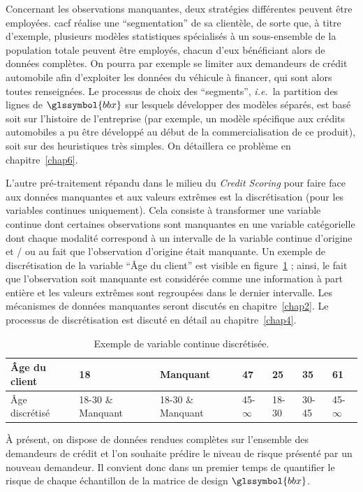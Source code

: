 Concernant les observations manquantes, deux stratégies différentes peuvent être employées. \gls{cacf} réalise une ``segmentation'' de sa clientèle, de sorte que, à titre d'exemple, plusieurs modèles statistiques spécialisés à un sous-ensemble de la population totale peuvent être employés, chacun d'eux bénéficiant alors de données complètes. On pourra par exemple se limiter aux demandeurs de crédit automobile afin d'exploiter les données du véhicule à financer, qui sont alors toutes renseignées. Le processus de choix des ``segments'', \textit{i.e.}\ la partition des lignes de $\glssymbol{bbx}$ sur lesquels développer des modèles séparés, est basé soit sur l'histoire de l'entreprise (par exemple, un modèle spécifique aux crédits automobiles a pu être développé au début de la commercialisation de ce produit), soit sur des heuristiques très simples. On détaillera ce problème en chapitre~\ref{chap6}.

L'autre pré-traitement répandu dans le milieu du \textit{Credit Scoring} pour faire face aux données manquantes et aux valeurs extrêmes est la discrétisation (pour les variables continues uniquement). Cela consiste à transformer une variable continue dont certaines observations sont manquantes en une variable catégorielle dont chaque modalité correspond à un intervalle de la variable continue d'origine et / ou au fait que l'observation d'origine était manquante. Un exemple de discrétisation de la variable ``Âge du client'' est visible en figure~\ref{tab:disc_ex} ; ainsi, le fait que l'observation soit manquante est considérée comme une information à part entière et les valeurs extrêmes sont regroupées dans le dernier intervalle. Les mécanismes de données manquantes seront discutés en chapitre~\ref{chap2}. Le processus de discrétisation est discuté en détail au chapitre~\ref{chap4}.

\begin{table}
\centering
\caption{\label{tab:disc_ex} Exemple de variable continue discrétisée.}
\begin{tabular}{l|l|l|l|l|l|l}
Âge du client & 18 & Manquant & 47 & 25 & 35 & 61 \\
\hline
Âge discrétisé & 18-30 \& Manquant & 18-30 \& Manquant & 45-$\infty$ & 18-30 & 30-45 & 45-$\infty$ \\
\end{tabular}
\end{table}

\`A présent, on dispose de données rendues complètes sur l'ensemble des demandeurs de crédit et l'on souhaite prédire le niveau de risque présenté par un nouveau demandeur. Il convient donc dans un premier temps de quantifier le risque de chaque échantillon de la matrice de design $\glssymbol{bbx}$.

